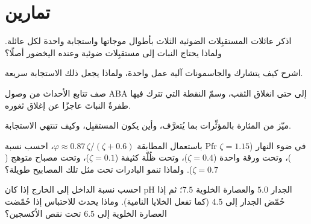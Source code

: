 \section{تمارين}

\begin{exercise}[$\star$]\label{exo:b3:plant-molecular-physiology:1}
اذكر عائلات المستقبِلات الضوئية الثلاث بأطوال موجاتها
واستجابة واحدة لكل عائلة. ولماذا يحتاج النبات إلى مستقبِلات
ضوئية وعنده اليخضور أصلًا؟
\end{exercise}

\begin{exercise}[$\star$]\label{exo:b3:plant-molecular-physiology:2}
اشرح كيف يتشارك   والجاسمونات آلية عمل
واحدة، ولماذا يجعل ذلك الاستجابة سريعة.
\end{exercise}

\begin{exercise}[$\star$]\label{exo:b3:plant-molecular-physiology:3}
صف تتابع الأحداث من وصول ABA إلى  حتى انغلاق
الثقب، وسمّ النقطة التي تترك فيها طفرةٌ النباتَ عاجزًا عن
إغلاق ثغوره.
\end{exercise}

\begin{exercise}[$\star$]\label{exo:b3:plant-molecular-physiology:4}
ميّز  من المثارة بالمؤثِّرات بما
يُتعرَّف، وأين يكون المستقبِل، وكيف تنتهي الاستجابة.
\end{exercise}

\begin{exercise}[$\star\star$]\label{exo:b3:plant-molecular-physiology:5}
باستعمال المطابقة $\varphi \approx 0.87\,\zeta/(\zeta + 0.6)$، احسب
نسبة Pfr في ضوء النهار ($\zeta = 1.15$)، وتحت ورقة واحدة ($\zeta =
0.4$)، وتحت ظُلّة كثيفة ($\zeta = 0.1$)، وتحت مصباح متوهج
($\zeta = 0.7$). ولماذا تنمو البادرات تحت مثل تلك المصابيح طويلة؟
\end{exercise}

\begin{exercise}[$\star\star$]\label{exo:b3:plant-molecular-physiology:6}
احسب نسبة الداخل إلى الخارج  إذا كان pH الجدار $5.0$
والعصارة الخلوية $7.5$؛ ثم إذا حُمّض الجدار إلى $4.5$ (كما
تفعل الخلايا النامية). وماذا يحدث للاحتباس إذا حُمّضت
العصارة الخلوية إلى $6.5$ تحت نقص الأكسجين؟
\end{exercise}

